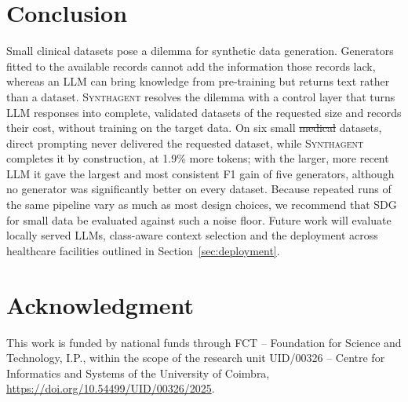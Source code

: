 \documentclass[conference]{IEEEtran}
\newcommand{\system}{\textsc{Synthagent}\xspace}
\providecommand{\DIFaddtex}[1]{{\protect\color{blue}\uwave{#1}}} %
\providecommand{\DIFdeltex}[1]{{\protect\color{red}\sout{#1}}}                      %
\providecommand{\DIFaddbegin}{} %
\providecommand{\DIFaddend}{} %
\providecommand{\DIFdelbegin}{} %
\providecommand{\DIFdelend}{} %
\providecommand{\DIFadd}[1]{\texorpdfstring{\DIFaddtex{#1}}{#1}} %
\providecommand{\DIFdel}[1]{\texorpdfstring{\DIFdeltex{#1}}{}} %
\newcommand{\DIFscaledelfig}{0.5}
\newlength{\DIFdelgraphicswidth} %
\newlength{\DIFdelgraphicsheight} %
\newcommand{\DIFaddincludegraphics}[2][]{{\color{blue}\fbox{\DIFOincludegraphics[#1]{#2}}}} %
\newcommand{\DIFdelincludegraphics}[2][]{%
\sbox{\DIFdelgraphicsbox}{\DIFOincludegraphics[#1]{#2}}%
\settoboxwidth{\DIFdelgraphicswidth}{\DIFdelgraphicsbox} %
\settoboxtotalheight{\DIFdelgraphicsheight}{\DIFdelgraphicsbox} %
\scalebox{\DIFscaledelfig}{%
\parbox[b]{\DIFdelgraphicswidth}{\usebox{\DIFdelgraphicsbox}\\[-\baselineskip] \rule{\DIFdelgraphicswidth}{0em}}\llap{\resizebox{\DIFdelgraphicswidth}{\DIFdelgraphicsheight}{%
\setlength{\unitlength}{\DIFdelgraphicswidth}%
\begin{picture}(1,1)%
\thicklines\linethickness{2pt} %
{\color[rgb]{1,0,0}\put(0,0){\framebox(1,1){}}}%
{\color[rgb]{1,0,0}\put(0,0){\line( 1,1){1}}}%
{\color[rgb]{1,0,0}\put(0,1){\line(1,-1){1}}}%
\end{picture}%
}\hspace*{3pt}}} %
} %
\DeclareRobustCommand{\DIFaddbegin}{\DIFOaddbegin \let\includegraphics\DIFaddincludegraphics} %
\DeclareRobustCommand{\DIFaddend}{\DIFOaddend \let\includegraphics\DIFOincludegraphics} %
\DeclareRobustCommand{\DIFdelbegin}{\DIFOdelbegin \let\includegraphics\DIFdelincludegraphics} %
\DeclareRobustCommand{\DIFdelend}{\DIFOaddend \let\includegraphics\DIFOincludegraphics} %
\begin{document}
\section{Conclusion}
\label{sec:conclusion}
Small clinical datasets pose a dilemma for synthetic data generation. Generators fitted to the available records cannot add the information those records lack, whereas an LLM can bring knowledge from pre-training but returns text rather than a dataset. \system resolves the dilemma with a control layer that turns LLM responses into complete, validated datasets of the requested size and records their cost, without training on the target data. On six small \DIFdelbegin \DIFdel{medical }\DIFdelend \DIFaddbegin \DIFadd{healthcare }\DIFaddend datasets, direct prompting never delivered the requested dataset, while \system completes it by construction, at 1.9\% more tokens; with the larger, more recent LLM it gave the largest and most consistent F1 gain of five generators, although no generator was significantly better on every dataset. Because repeated runs of the same pipeline vary as much as most design choices, we recommend that SDG for small data be evaluated against such a noise floor. Future work will evaluate locally served LLMs, class-aware context selection and the deployment across healthcare facilities outlined in Section~\ref{sec:deployment}.

\section*{Acknowledgment}
This work is funded by national funds through FCT -- Foundation for Science and Technology, I.P., within the scope of the research unit UID/00326 -- Centre for Informatics and Systems of the University of Coimbra, \url{https://doi.org/10.54499/UID/00326/2025}.



\end{document}
